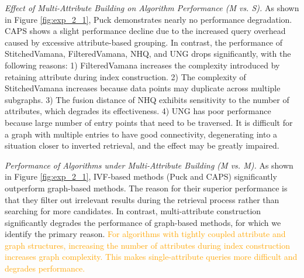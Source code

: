 \documentclass[sigconf, nonacm]{acmart}
\begin{document}
{	\textit{Effect of Multi-Attribute Building on Algorithm Performance (M vs. S).}
	As shown in Figure \ref{fig:exp_2_1}, Puck demonstrates nearly no performance degradation. CAPS shows a slight performance decline due to the increased query overhead caused by excessive attribute-based grouping. In contrast, the performance of StitchedVamana, FilteredVamana, NHQ, and UNG drops significantly, with the following reasons: 1) FilteredVamana increases the complexity introduced by retaining attribute during index construction. 2) The complexity of StitchedVamana increases because data points may duplicate across multiple subgraphs. 3) The fusion distance of NHQ exhibits sensitivity to the number of attributes, which degrades its effectiveness. 4) UNG has poor performance because large number of entry points that need to be traversed. It is difficult for a graph with multiple entries to have good connectivity, degenerating into a situation closer to inverted retrieval, and the effect may be greatly impaired.
	
	
	
	\textit{Performance of Algorithms under Multi-Attribute Building (M vs. M).}  
	As shown in Figure \ref{fig:exp_2_1}, IVF-based methods (Puck and CAPS) significantly outperform graph-based methods. The reason for their superior performance is that they filter out irrelevant results during the retrieval process rather than searching for more candidates. In contrast, multi-attribute construction significantly degrades the performance of graph-based methods, for which we identify the primary reason. 
	\textcolor{orange}{For algorithms with tightly coupled attribute and graph structures, increasing the number of attributes during index construction increases graph complexity. This makes single-attribute queries more difficult and degrades performance.}
	
	
	\begin{figure}
		\centering
		

\end{figure}}
\end{document}
